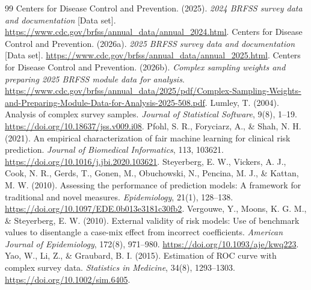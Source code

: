 \begingroup\small\sloppy\setlength{\parskip}{5pt}
\begin{thebibliography}{99}
\setlength{\itemsep}{5pt}\setlength{\bibhang}{1.3em}
 Centers for Disease Control and Prevention. (2025). \emph{2024 BRFSS survey data and documentation} [Data set]. \url{https://www.cdc.gov/brfss/annual_data/annual_2024.html}.
 Centers for Disease Control and Prevention. (2026a). \emph{2025 BRFSS survey data and documentation} [Data set]. \url{https://www.cdc.gov/brfss/annual_data/annual_2025.html}.
 Centers for Disease Control and Prevention. (2026b). \emph{Complex sampling weights and preparing 2025 BRFSS module data for analysis}. \url{https://www.cdc.gov/brfss/annual_data/2025/pdf/Complex-Sampling-Weights-and-Preparing-Module-Data-for-Analysis-2025-508.pdf}.
 Lumley, T. (2004). Analysis of complex survey samples. \emph{Journal of Statistical Software}, 9(8), 1--19. \url{https://doi.org/10.18637/jss.v009.i08}.
 Pfohl, S. R., Foryciarz, A., \& Shah, N. H. (2021). An empirical characterization of fair machine learning for clinical risk prediction. \emph{Journal of Biomedical Informatics}, 113, 103621. \url{https://doi.org/10.1016/j.jbi.2020.103621}.
 Steyerberg, E. W., Vickers, A. J., Cook, N. R., Gerds, T., Gonen, M., Obuchowski, N., Pencina, M. J., \& Kattan, M. W. (2010). Assessing the performance of prediction models: A framework for traditional and novel measures. \emph{Epidemiology}, 21(1), 128--138. \url{https://doi.org/10.1097/EDE.0b013e3181c30fb2}.
 Vergouwe, Y., Moons, K. G. M., \& Steyerberg, E. W. (2010). External validity of risk models: Use of benchmark values to disentangle a case-mix effect from incorrect coefficients. \emph{American Journal of Epidemiology}, 172(8), 971--980. \url{https://doi.org/10.1093/aje/kwq223}.
 Yao, W., Li, Z., \& Graubard, B. I. (2015). Estimation of ROC curve with complex survey data. \emph{Statistics in Medicine}, 34(8), 1293--1303. \url{https://doi.org/10.1002/sim.6405}.
\end{thebibliography}
\endgroup
